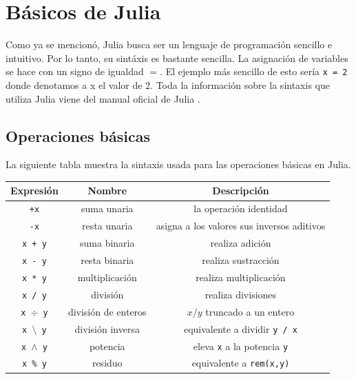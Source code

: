 \section{Básicos de Julia}
Como ya se mencionó, Julia busca ser un lenguaje de programación sencillo e intuitivo. Por lo tanto, su sintáxis es bastante sencilla. La asignación de variables se hace con un signo de igualdad $=$. El ejemplo más sencillo de esto sería \texttt{x = 2} donde denotamos a x el valor de 2. Toda la información sobre la sintaxis que utiliza Julia viene del manual oficial de Julia \citep{Julia_manual}.

\subsection{Operaciones básicas}
La siguiente tabla muestra la sintaxis usada para las operaciones básicas en Julia. 
\\

\begin{tabular}{|c|c|c|}
\hline 
\rule[-1ex]{0pt}{2.5ex} Expresión & Nombre & Descripción \\ 
\hline 
\rule[-1ex]{0pt}{2.5ex} \texttt{+x} & suma unaria & la operación identidad \\ 
\hline 
\rule[-1ex]{0pt}{2.5ex} \texttt{-x} & resta unaria & asigna a los valores sus inversos aditivos \\ 
\hline 
\rule[-1ex]{0pt}{2.5ex} \texttt{x + y} & suma binaria & realiza adición \\ 
\hline 
\rule[-1ex]{0pt}{2.5ex} \texttt{x - y} & resta binaria & realiza sustracción \\
\hline 
\rule[-1ex]{0pt}{2.5ex} \texttt{x * y} & multiplicación & realiza multiplicación \\
\hline 
\rule[-1ex]{0pt}{2.5ex} \texttt{x / y} & división & realiza divisiones \\
\hline 
\rule[-1ex]{0pt}{2.5ex} \texttt{x $\div$ y} & división de enteros & $x / y$ truncado a un entero \\
\hline 
\rule[-1ex]{0pt}{2.5ex} \texttt{x $\setminus$ y} & división inversa & equivalente a dividir \texttt{y / x} \\
\hline 
\rule[-1ex]{0pt}{2.5ex} \texttt{x $\wedge$ y} & potencia & eleva \texttt{x} a la potencia \texttt{y} \\
\hline 
\rule[-1ex]{0pt}{2.5ex} \texttt{x \% y} & residuo & equivalente a \texttt{rem(x,y)} \\
\hline 
\end{tabular} 

